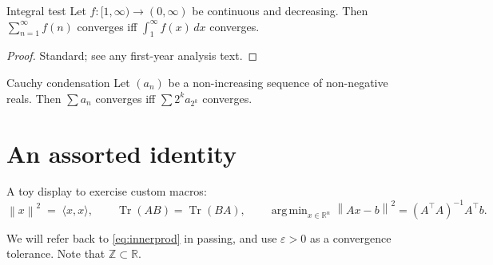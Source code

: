\documentclass{article}
\newcommand{\R}{\mathbb{R}}
\newcommand{\norm}[1]{\left\lVert #1 \right\rVert}
\newcommand{\inner}[2]{\langle #1, #2 \rangle}
\DeclareMathOperator{\Tr}{Tr}
\DeclareMathOperator*{\argmin}{arg\,min}
\providecommand{\eps}{\varepsilon}
\def\Z{\mathbb{Z}}
\begin{document}
\begin{lemma}[role=standard]{Integral test}
\label{lem:integral-test}
Let $f \colon [1, \infty) \to (0, \infty)$ be continuous and decreasing.
Then $\sum_{n=1}^{\infty} f(n)$ converges iff $\int_1^{\infty} f(x)\,dx$
converges.
\end{lemma}

\begin{proof}
Standard; see any first-year analysis text.
\end{proof}

\begin{theorem}[role=omitted]{Cauchy condensation}
\label{thm:cauchy-cond}
Let $(a_n)$ be a non-increasing sequence of non-negative reals. Then
$\sum a_n$ converges iff $\sum 2^k a_{2^k}$ converges.
\end{theorem}

\section{An assorted identity}

A toy display to exercise custom macros:
\begin{equation}
\label{eq:innerprod}
  \norm{x}^2 \;=\; \inner{x}{x}, \qquad \Tr(AB) = \Tr(BA), \qquad
  \argmin_{x \in \R^n} \norm{Ax - b}^2 = (A^\top A)^{-1} A^\top b.
\end{equation}

We will refer back to \eqref{eq:innerprod} in passing, and use $\eps > 0$ as
a convergence tolerance. Note that $\Z \subset \R$.
\end{document}
